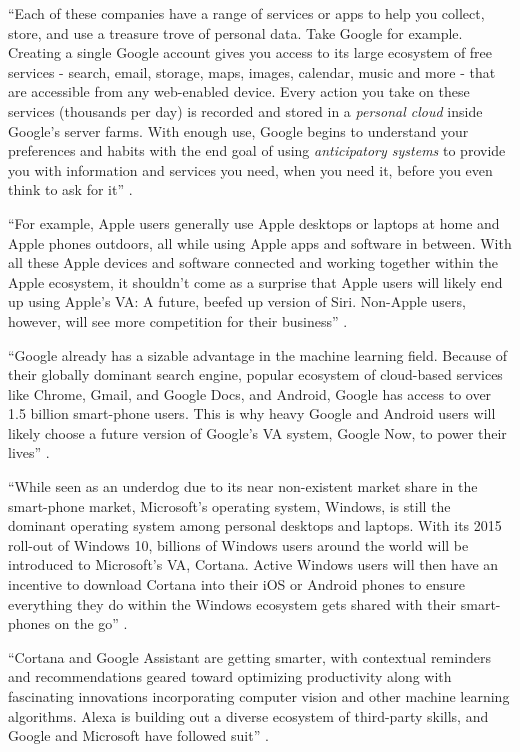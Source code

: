 ``Each of these companies have a range of services or apps to help you collect, store, and use a treasure trove of personal data. Take Google for example. Creating a single Google account gives you access to its large ecosystem of free services - search, email, storage, maps, images, calendar, music and more - that are accessible from any web-enabled device. Every action you take on these services (thousands per day) is recorded and stored in a {\em personal cloud} inside Google's server farms. With enough use, Google begins to understand your preferences and habits with the end goal of using {\em anticipatory systems} to provide you with information and services you need, when you need it, before you even think to ask for it'' \cite{Tal2015internet}.

``For example, Apple users generally use Apple desktops or laptops at home and Apple phones outdoors, all while using Apple apps and software in between. With all these Apple devices and software connected and working together within the Apple ecosystem, it shouldn't come as a surprise that Apple users will likely end up using Apple's VA: A future, beefed up version of Siri. Non-Apple users, however, will see more competition for their business'' \cite{Tal2015internet}.

``Google already has a sizable advantage in the machine learning field. Because of their globally dominant search engine, popular ecosystem of cloud-based services like Chrome, Gmail, and Google Docs, and Android, Google has access to over 1.5 billion smart-phone users. This is why heavy Google and Android users will likely choose a future version of Google's VA system, Google Now, to power their lives'' \cite{Tal2015internet}.

``While seen as an underdog due to its near non-existent market share in the smart-phone market, Microsoft's operating system, Windows, is still the dominant operating system among personal desktops and laptops. With its 2015 roll-out of Windows 10, billions of Windows users around the world will be introduced to Microsoft's VA, Cortana. Active Windows users will then have an incentive to download Cortana into their iOS or Android phones to ensure everything they do within the Windows ecosystem gets shared with their smart-phones on the go'' \cite{Tal2015internet}.

``Cortana and Google Assistant are getting smarter, with contextual reminders and recommendations geared toward optimizing productivity along with fascinating innovations incorporating computer vision and other machine learning algorithms. Alexa is building out a diverse ecosystem of third-party skills, and Google and Microsoft have followed suit'' \cite{Marvin2017them}.

